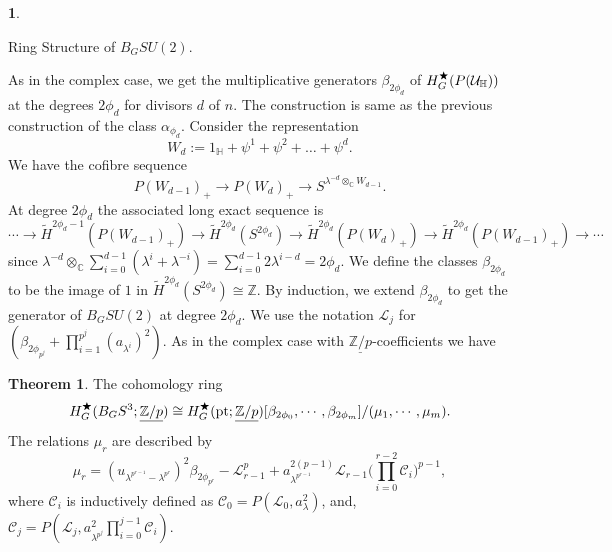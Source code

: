 \documentclass[a4paper,leqno,11pt]{amsart}
\theoremstyle{plain}
\theoremstyle{definition}
\newtheorem{subsec}[theorem]{}
\newtheorem{thm}[theorem]{Theorem}
\theoremstyle{remark}
\theoremstyle{definition}
\newcommand{\C}{{\mathbb C}}
\newcommand{\Z}{{\mathbb{Z}}}
\newcommand{\uZp}{\underline{\Z/p}}
\newcommand\CC{{\mathcal C}}
\newcommand\LL{{\mathcal L}}
\newcommand{\ra}{\rightarrow}
\newenvironment{mysubsection}[2][]
{\begin{subsec}\begin{upshape}\begin{bfseries}{#2.}
			\end{bfseries}{#1}}
		{\end{upshape}\end{subsec}}
\def\Z{\mathbb{Z}}
\def\a{\alpha}
\def\lam{\lambda}
\def\C{\mathbb{C}}
\def\ra{\rightarrow}
\numberwithin{equation}{section}
\def\tH{\tilde{H}}
\newcommand{\pt}{\textup{pt}}
\begin{document}
	\begin{mysubsection}{Ring Structure of $B_{G}SU(2)$}
	As in the complex case, we get the multiplicative generators $\beta_{2\phi_d}$ of $H^{\bigstar}_{G}(P(\mathcal{U}_{\Bbb H}))$ at the degrees $2\phi_{d}$ for divisors $ d $ of $ n $. The construction is same as the previous construction of the class $\a_{\phi_{d}}$. Consider  the representation 
		$$W_d:=1_{\mathbb{H}} + \psi^{1} + \psi^{2}+\dots + \psi^{d}.
		$$
		We have the cofibre sequence 
		$$P(W_{d-1})_{+}\ra P(W_{d})_+\ra S^{\lam^{-d}\otimes_{\C}W_{d-1}}.
		$$
		At degree ${2\phi_{d}}$ the associated long exact sequence is 
		$$\cdots \ra \tH^{2\phi_{d}-1}(P(W_{d-1})_+)\ra \tH^{2\phi_{d}}(S^{2\phi_{d}})\ra \tH^{2\phi_{d}}(P(W_{d})_+)\ra \tH^{2\phi_{d}}(P(W_{d-1})_+)\ra  \cdots
		$$
		since $\lam^{-d}\otimes_\C \sum_{i=0}^{d-1}(\lam^{i}+\lam^{-i})= \sum_{i=0}^{d-1}2\lam^{i-d} = 2\phi_{d}$. We define the classes $\beta_{2\phi_{d}}$ to be the image of $1$ in $ \tH^{2\phi_{d}}(S^{2\phi_{d}}) \cong \Z$. By induction, we extend $\beta_{2\phi_{d}}$ to get the generator of $B_{G}SU(2)$ at degree $2\phi_{d}$. We use the notation  $ \mathcal{L}_{j} $ for $ (\beta_{2\phi_{p^{j}}} +  \prod_{i=1}^{p^j} (a_{\lambda^i})^2 ) $. As in the complex case with $\uZp$-coefficients we have 
		\begin{thm}\label{ringstr2} 
The cohomology ring 
\[ H^\bigstar_G (B_GS^3;\uZp) \cong H^\bigstar_G(\pt;\uZp)[\beta_{2\phi_0},\cdots,\beta_{2\phi_m}]/(\mu_1,\cdots, \mu_m).\]
	The relations $\mu_r$ are described by 
	\[\mu_r= (u_{\lam^{p^{r-1}}-\lam^{p^{r}}})^2\beta_{2\phi_{p^{r}}}- \LL_{r-1}^p + a_{\lambda^{p^{r-1}}}^{2(p-1)}\LL_{r-1}\big(\prod_{i=0}^{r-2} \CC_i\big)^{p-1}, \]
	where $\CC_i$ is inductively defined as $\CC_0=P(\LL_0,a^2_\lambda)$, and,  $\CC_j= P(\LL_j,a^2_{\lambda^{p^j}}\prod_{i=0}^{j-1} \CC_i)$.
		\end{thm}

	\end{mysubsection}
\end{document}
